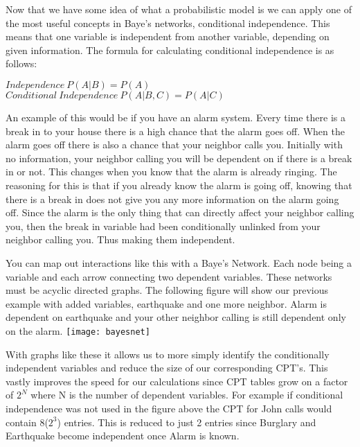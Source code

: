  \par Now that we have some idea of what a probabilistic model is we can apply one of the most useful concepts in Baye's networks, conditional independence. This means that one variable is independent from another variable, depending on given information. The formula for calculating conditional independence is as follows: 
 \begin{center}
 	 \vspace{10px} $Independence\:P(A|B)=P(A)$ \vspace{10px} $Conditional\:Independence \:P(A|B,C) = P(A|C)$  \vspace{10px} 
 \end{center}
  \par An example of this would be if you have an alarm system. Every time there is a break in to your house there is a high chance that the alarm goes off. When the alarm goes off there is also a chance that your neighbor calls you. Initially with no information, your neighbor calling you will be dependent on if there is a break in or not. This changes when you know that the alarm is already ringing. The reasoning for this is that if you already know the alarm is going off, knowing that there is a break in does not give you any more information on the alarm going off. Since the alarm is the only thing that can directly affect your neighbor calling you, then the break in variable had been conditionally unlinked from your neighbor calling you. Thus making them independent. 
  \par You can map out interactions like this with a Baye's Network. Each node being a variable and each arrow connecting two dependent variables. These networks must be acyclic directed graphs. The following figure will show our previous example with added variables, earthquake and one more neighbor. Alarm is dependent on earthquake and your other neighbor calling is still dependent only on the alarm.\newline
  \texttt{[image: bayesnet]}
  \par With graphs like these it allows us to more simply identify the conditionally independent variables and reduce the size of our corresponding CPT's. This vastly improves the speed for our calculations since CPT tables grow on a factor of $2^N$ where N is the number of dependent variables. For example if conditional independence was not used in the figure above the CPT for John calls would contain 8($2^3$) entries. This is reduced to just 2 entries since Burglary and Earthquake become independent once Alarm is known.